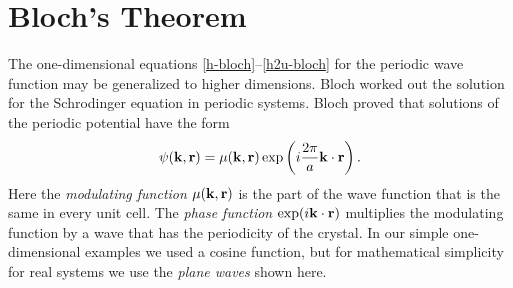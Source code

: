 \section{Bloch's Theorem}
The one-dimensional equations \ref{h-bloch}--\ref{h2u-bloch} for the
periodic wave function may be generalized to higher dimensions.
Bloch worked out the solution for the Schrodinger equation in periodic
systems. Bloch proved that solutions of the periodic potential
have the form
\begin{equation}
 \psi(\mathbf{k},\mathbf{r}) = \mu(\mathbf{k},\mathbf{r})
    \exp\left(i\frac{2\pi}{a}\mathbf{k}\cdot\mathbf{r}\right).
\end{equation}
Here the \emph{modulating function} $\mu(\mathbf{k},\mathbf{r})$ is
the part of the wave function that is the same in every unit cell. The
\emph{phase function} $\exp(i\mathbf{k}\cdot\mathbf{r})$ multiplies the
modulating function by a wave that has the periodicity of the
crystal. In our simple one-dimensional examples we used a cosine
function, but for mathematical simplicity for real systems we use the
\emph{plane waves} shown here.

